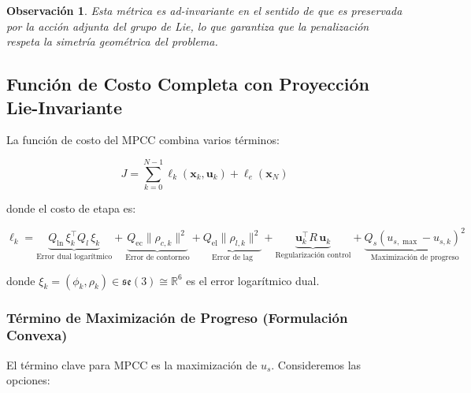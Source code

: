 \documentclass[11pt,a4paper]{article}
\newtheorem{remark}[theorem]{Observación}
\begin{document}
\begin{remark}
Esta métrica es \emph{ad-invariante} en el sentido de que es preservada por la acción adjunta del grupo de Lie, lo que garantiza que la penalización respeta la simetría geométrica del problema.
\end{remark}

\subsection{Función de Costo Completa con Proyección Lie-Invariante}
\label{subsec:mpcc_cost_function}

La función de costo del MPCC combina varios términos:

\begin{equation}
\boxed{
    J = \sum_{k=0}^{N-1} \ell_k(\mathbf{x}_k, \mathbf{u}_k) + \ell_e(\mathbf{x}_N)
}
    \label{eq:mpcc_complete_cost}
\end{equation}

donde el costo de etapa es:

\begin{equation}
    \ell_k = \underbrace{Q_{\text{ln}} \, \xi_k^\top Q_l \, \xi_k}_{\text{Error dual logarítmico}} 
           + \underbrace{Q_{\text{ec}} \|\rho_{c,k}\|^2}_{\text{Error de contorneo}} 
           + \underbrace{Q_{\text{el}} \|\rho_{l,k}\|^2}_{\text{Error de lag}}
           + \underbrace{\mathbf{u}_k^\top R \, \mathbf{u}_k}_{\text{Regularización control}}
           + \underbrace{Q_s (u_{s,\max} - u_{s,k})^2}_{\text{Maximización de progreso}}
    \label{eq:stage_cost}
\end{equation}

donde $\xi_k = (\phi_k, \rho_k) \in \mathfrak{se}(3) \cong \mathbb{R}^6$ es el error logarítmico dual.

\subsubsection{Término de Maximización de Progreso (Formulación Convexa)}

El término clave para MPCC es la maximización de $u_s$. Consideremos las opciones:
\end{document}
